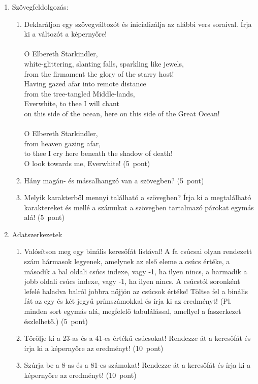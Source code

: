 \documentclass[a4paper,12pt]{letter}
\begin{document}
 \begin{enumerate}
 \item Szövegfeldolgozás:
  \begin{enumerate}
  \item Deklaráljon egy szövegváltozót és inicializálja az alábbi vers soraival. Írja ki a változót a képernyőre! \\ \\O Elbereth Starkindler,\\white-glittering, slanting falls, sparkling like jewels,\\from the firmament the glory of the starry host!\\Having gazed afar into remote distance\\from the tree-tangled Middle-lands,\\Everwhite, to thee I will chant\\on this side of the ocean, here on this side of the Great Ocean!\\ \\O Elbereth Starkindler,\\from heaven gazing afar,\\to thee I cry here beneath the shadow of death!\\O look towards me, Everwhite!     \hfill (5~pont)
  \item Hány magán- és mássalhangzó van a szövegben? \hfill (5~pont)
  \item Melyik karakterből mennyi található a szövegben? Írja ki a megtalálható karaktereket és mellé a számukat a szövegben tartalmazó párokat egymás alá! \hfill (5~pont)
   \end{enumerate}
 \item Adatszerkezetek
   \begin{enumerate}
   \item Valósítson meg egy binális keresőfát listával! A fa csúcsai olyan rendezett szám hármasok legyenek, amelynek az első eleme a csúcs értéke, a második a bal oldali csúcs indexe, vagy -1, ha ilyen nincs, a harmadik a jobb oldali csúcs indexe, vagy -1, ha ilyen nincs. A csúcstól soronként lefelé haladva balról jobbra nőjjön az csúcsok értéke! Töltse fel a binális fát az egy és két jegyű prímszámokkal és írja ki az eredményt! (Pl. minden sort egymás alá, megfelelő tabulálással, amellyel a faszerkezet észlelhető.) \hfill (5~pont)
   \item Törölje ki a 23-as és a 41-es értékű csúcsokat! Rendezze át a keresőfát és írja ki a képernyőre az eredményt! \hfill (10~pont)
   \item Szúrja be a 8-as és a 81-es számokat! Rendezze át a keresőfát és írja ki a képernyőre az eredményt! \hfill (10~pont)

\end{enumerate}
\end{enumerate}
\end{document}
